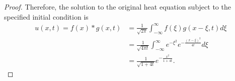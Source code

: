 \begin{proof}
  Therefore, the solution to the original heat equation subject to the specified initial condition
  is
  \begin{align*}
    u(x, t) = f(x) \ast g(x, t) &= \frac{1}{\sqrt{2\pi}}\int_{-\infty}^\infty f(\xi) g(x-\xi, t) d\xi \\
    &= \frac{1}{\sqrt{4\pi t}}\int_{-\infty}^\infty e^{-\xi^2} e^{-\frac{(x-\xi)^2}{4t}} d\xi \\
    &= \frac{1}{\sqrt{1 + 4t}}e^{-\frac{x^2}{1+4t}}.
  \end{align*}
\end{proof}
\newpage
